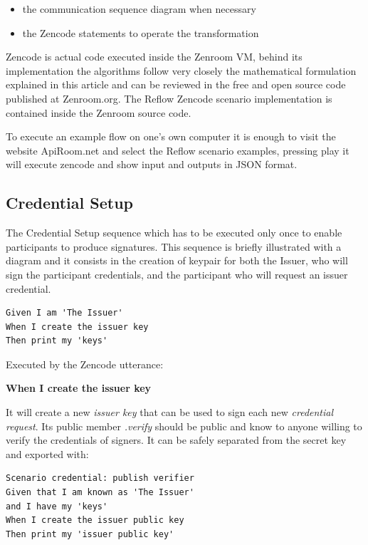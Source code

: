\documentclass[twocolumn]{article}
\begin{document}
\begin{itemize}
  \item the communication sequence diagram when necessary
  \item the Zencode statements to operate the transformation
\end{itemize}

Zencode is actual code executed inside the Zenroom VM, behind its
implementation the algorithms follow very closely the mathematical
formulation explained in this article and can be reviewed in the free
and open source code published at Zenroom.org. The Reflow Zencode
scenario implementation is contained inside the Zenroom source code.

To execute an example flow on one's own computer it is enough to visit
the website ApiRoom.net and select the Reflow scenario examples,
pressing play it will execute zencode and show input and outputs in
JSON format.

\subsection*{Credential Setup}

The Credential Setup sequence which has to be executed only once to
enable participants to produce signatures. This sequence is briefly
illustrated with a diagram and it consists in the creation of keypair
for both the Issuer, who will sign the participant credentials, and
the participant who will request an issuer credential.

\begin{lstlisting}[style=zencode,caption={Issuer Keygen}]
Given I am 'The Issuer'
When I create the issuer key
Then print my 'keys'  
\end{lstlisting}

Executed by the Zencode utterance:

\textbf{When I create the issuer key}

It will create a new \emph{issuer key} that can be used to sign
each new \emph{credential request}. Its public member \emph{.verify}
should be public and know to anyone willing to verify the credentials
of signers. It can be safely separated from the secret key and
exported with:

\begin{lstlisting}[style=zencode,caption={Issuer verifier}]
Scenario credential: publish verifier
Given that I am known as 'The Issuer'
and I have my 'keys'
When I create the issuer public key
Then print my 'issuer public key'
\end{lstlisting}
\end{document}
